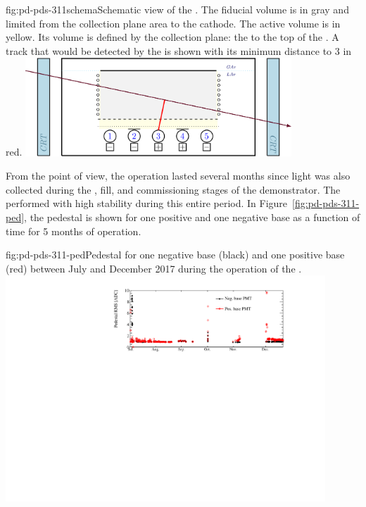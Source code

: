 \begin{dunefigure}{fig:pd-pds-311schema}{Schematic view of the . 
The fiducial volume is in gray and limited from the collection plane area to the cathode. The active volume is in yellow. Its volume is defined by the collection plane: the  to the top of the . A track that would be detected by the  is shown with its minimum distance to  \num{3} in red.}
\includegraphics[width=0.75\textwidth]{graphics/dppd_7_2_v2}
\end{dunefigure}

From the  point of view, the  operation lasted several months since light was also collected during the \cooldown, fill, and commissioning stages of the demonstrator.
The  performed with high stability during this entire period. 
In Figure~\ref{fig:pd-pds-311-ped}, the  pedestal  is shown for one positive and one negative base  as a function of time for \num{5} months of operation. 

\begin{dunefigure}{fig:pd-pds-311-ped}{Pedestal  for one negative base  (black) and one positive base  (red) between July and December 2017 during the operation of the .}
\includegraphics[width=0.9\textwidth]{graphics/dppd_311_pedestal_rms.pdf}
\end{dunefigure}

